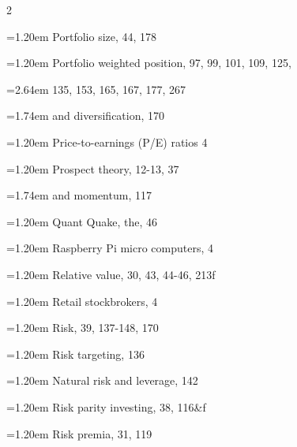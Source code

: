 {\begin{multicols}{2}
\par \noindent\hangindent=1.20em\hspace*{0.00em} Portfolio size, 44, 178
\par \noindent\hangindent=1.20em\hspace*{0.00em} Portfolio weighted position, 97, 99, 101, 109, 125,
\par \noindent\hangindent=2.64em\hspace*{1.44em} 135, 153, 165, 167, 177, 267
\par \noindent\hangindent=1.74em\hspace*{0.54em} and diversification, 170
\par \noindent\hangindent=1.20em\hspace*{0.00em} Price-to-earnings (P/E) ratios 4
\par \noindent\hangindent=1.20em\hspace*{0.00em} Prospect theory, 12-13, 37
\par \noindent\hangindent=1.74em\hspace*{0.54em} and momentum, 117
\par \noindent\hangindent=1.20em\hspace*{0.00em} Quant Quake, the, 46
\par \noindent\hangindent=1.20em\hspace*{0.00em} Raspberry Pi micro computers, 4
\par \noindent\hangindent=1.20em\hspace*{0.00em} Relative value, 30, 43, 44-46, 213f
\par \noindent\hangindent=1.20em\hspace*{0.00em} Retail stockbrokers, 4
\par \noindent\hangindent=1.20em\hspace*{0.00em} Risk, 39, 137-148, 170
\par \noindent\hangindent=1.20em\hspace*{0.00em} Risk targeting, 136
\par \noindent\hangindent=1.20em\hspace*{0.00em} Natural risk and leverage, 142
\par \noindent\hangindent=1.20em\hspace*{0.00em} Risk parity investing, 38, 116\&f
\par \noindent\hangindent=1.20em\hspace*{0.00em} Risk premia, 31, 119

\end{multicols}}
